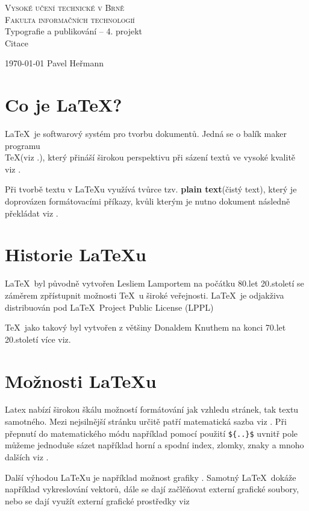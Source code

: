 \documentclass[a4paper,12pt]{article}
\begin{document}
\begin{titlepage}

    \begin{center}
        \Huge
        \textsc{Vysoké učení technické v Brně\\\huge{Fakulta informačních technologií} }\\
        \LARGE{Typografie a publikování -- 4. projekt\\}
        \Huge{Citace}
    \end{center}
    \LARGE{\today} 
    \hfill
    \LARGE{Pavel Heřmann}
\end{titlepage}

\section{Co je \LaTeX ?}
\LaTeX~je softwarový systém pro tvorbu dokumentů. Jedná se o balík maker programu \\ \TeX (viz \cite{TexArticle}.), který přináší širokou perspektivu při sázení textů ve vysoké kvalitě viz \cite{BritannicaOnline}. \par 
Při tvorbě textu v \LaTeX u využívá tvůrce tzv. \textbf{plain text}(čistý text), který je doprovázen formátovacími příkazy, kvůli kterým je nutno dokument následně překládat viz \cite{RybickaBook}. \par

\section{Historie \LaTeX u}
\LaTeX~byl původně vytvořen Lesliem Lamportem na počátku 80.let 20.století se záměrem zpřístupnit možnosti \TeX~u široké veřejnosti. \LaTeX~je odjakživa distribuován pod \LaTeX~Project Public License (LPPL) \par 
\TeX~jako takový byl vytvořen z většiny Donaldem Knuthem na konci 70.let 20.století více viz. \cite{SwetavaOnline}

\section{Možnosti \LaTeX u}
Latex nabízí širokou škálu možností formátování jak vzhledu stránek, tak textu samotného. Mezi nejsilnější stránku určitě patří matematická sazba viz \cite{MathOnline}. Při přepnutí do matematického módu například pomocí použití \verb=${..}$= uvnitř pole můžeme jednoduše sázet například horní a spodní index, zlomky, znaky a mnoho dalších viz \cite{KocbachOnline}. \par
Další výhodou \LaTeX u  je například možnost grafiky \cite{GoossensBook}. Samotný \LaTeX~dokáže například vykreslování vektorů, dále se dají začlěňovat externí grafické soubory, nebo se dají využít externí grafické prostředky viz \cite{BunkaThesis}
\end{document}
